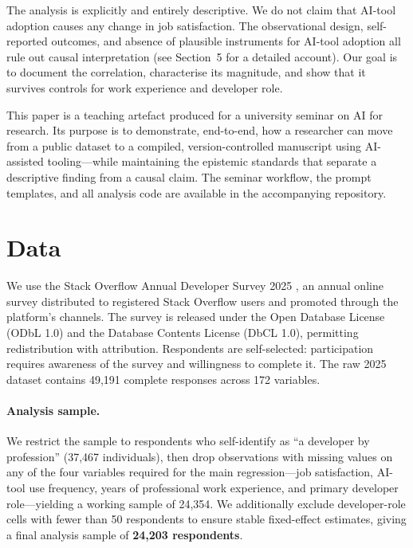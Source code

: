 \documentclass[11pt]{article}
\begin{document}
The analysis is explicitly and entirely descriptive. We do not claim that
AI-tool adoption causes any change in job satisfaction. The observational
design, self-reported outcomes, and absence of plausible instruments for
AI-tool adoption all rule out causal interpretation (see Section~5 for a
detailed account). Our goal is to document the correlation, characterise its
magnitude, and show that it survives controls for work experience and
developer role.

This paper is a teaching artefact produced for a university seminar on AI for
research. Its purpose is to demonstrate, end-to-end, how a researcher can
move from a public dataset to a compiled, version-controlled manuscript using
AI-assisted tooling---while maintaining the epistemic standards that separate
a descriptive finding from a causal claim. The seminar workflow, the prompt
templates, and all analysis code are available in the accompanying repository.

\section{Data}

We use the Stack Overflow Annual Developer Survey 2025
\citep{stackoverflow2025survey}, an annual online survey distributed to
registered Stack Overflow users and promoted through the platform's channels.
The survey is released under the Open Database License (ODbL 1.0) and the
Database Contents License (DbCL 1.0), permitting redistribution with
attribution. Respondents are self-selected: participation requires awareness
of the survey and willingness to complete it. The raw 2025 dataset contains
49,191 complete responses across 172 variables.

\paragraph{Analysis sample.}
We restrict the sample to respondents who self-identify as
``a developer by profession'' (37,467 individuals), then drop observations
with missing values on any of the four variables required for the main
regression---job satisfaction, AI-tool use frequency, years of professional
work experience, and primary developer role---yielding a working sample of
24,354. We additionally exclude developer-role cells with fewer than 50
respondents to ensure stable fixed-effect estimates, giving a final analysis
sample of \textbf{24,203 respondents}.
\end{document}

